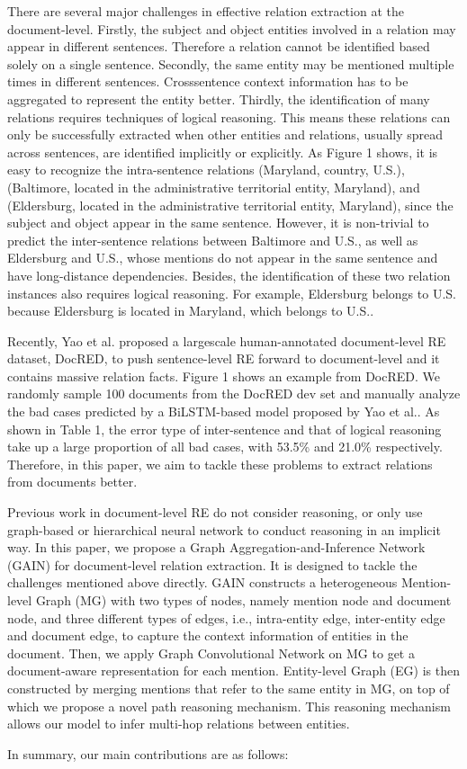 \documentclass[bachelor]{thesis-uestc}
\begin{document}
There are several major challenges in effective relation extraction at the document-level. Firstly, the subject and object entities involved in a relation may appear in different sentences. Therefore a relation cannot be identified based solely on a single sentence. Secondly, the same entity may be mentioned multiple times in different sentences. Crosssentence context information has to be aggregated to represent the entity better. Thirdly, the identification of many relations requires techniques of logical reasoning. This means these relations can only be successfully extracted when other entities and relations, usually spread across sentences, are identified implicitly or explicitly. As Figure 1 shows, it is easy to recognize the intra-sentence relations (Maryland, country, U.S.), (Baltimore, located in the administrative territorial entity, Maryland), and (Eldersburg, located in the administrative territorial entity, Maryland), since the subject and object appear in the same sentence. However, it is non-trivial to predict the inter-sentence relations between Baltimore and U.S., as well as Eldersburg and U.S., whose mentions do not appear in the same sentence and have long-distance dependencies. Besides, the identification of these two relation instances also requires logical reasoning. For example, Eldersburg belongs to U.S. because Eldersburg is located in Maryland, which belongs to U.S..\par

Recently, Yao et al. proposed a largescale human-annotated document-level RE dataset, DocRED, to push sentence-level RE forward to document-level and it contains massive relation facts. Figure 1 shows an example from DocRED. We randomly sample 100 documents from the DocRED dev set and manually analyze the bad cases predicted by a BiLSTM-based model proposed by Yao et al.. As shown in Table 1, the error type of inter-sentence and that of logical reasoning take up a large proportion of all bad cases, with 53.5\% and 21.0\% respectively. Therefore, in this paper, we aim to tackle these problems to extract relations from documents better.\par

Previous work in document-level RE do not consider reasoning, or only use graph-based or hierarchical neural network to conduct reasoning in an implicit way. In this paper, we propose a Graph Aggregation-and-Inference Network (GAIN) for document-level relation extraction. It is designed to tackle the challenges mentioned above directly. GAIN constructs a heterogeneous Mention-level Graph (MG) with two types of nodes, namely mention node and document node, and three different types of edges, i.e., intra-entity edge, inter-entity edge and document edge, to capture the context information of entities in the document. Then, we apply Graph Convolutional Network on MG to get a document-aware representation for each mention. Entity-level Graph (EG) is then constructed by merging mentions that refer to the same entity in MG, on top of which we propose a novel path reasoning mechanism. This reasoning mechanism allows our model to infer multi-hop relations between entities. \par
In summary, our main contributions are as follows: 
\end{document}
